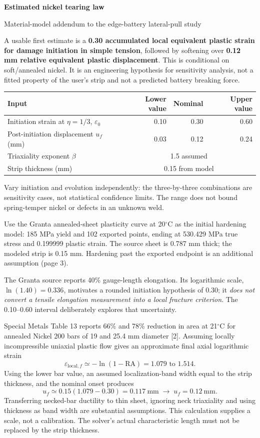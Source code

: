 \documentclass[10pt,a4paper]{article}
\newcommand{\ReportHeading}[1]{\par\vspace{6pt}{\large\bfseries\color{Teal}#1}\par\vspace{3pt}}
\newcommand{\PageTitle}[1]{{\LARGE\bfseries\color{Navy}#1\par}\vspace{7pt}}
\begin{document}
\PageTitle{Estimated nickel tearing law}
{\large\color{Teal}Material-model addendum to the edge-battery lateral-pull study}\par
A usable first estimate is a \textbf{0.30 accumulated local equivalent plastic strain for damage initiation in simple tension}, followed by softening over \textbf{0.12 mm relative equivalent plastic displacement}. This is conditional on soft/annealed nickel. It is an engineering hypothesis for sensitivity analysis, not a fitted property of the user's strip and not a predicted battery breaking force.

\ReportHeading{Proposed inputs}
\begin{center}
\begin{tabular}{p{.45\linewidth}rrr}\toprule
Input & Lower value & Nominal & Upper value\\\midrule
Initiation strain at $\eta=1/3$, $\varepsilon_0$ & 0.10 & 0.30 & 0.60\\
Post-initiation displacement $u_f$ (mm) & 0.03 & 0.12 & 0.24\\
Triaxiality exponent $\beta$ & \multicolumn{3}{c}{1.5 assumed}\\
Strip thickness (mm) & \multicolumn{3}{c}{0.15 from model}\\\bottomrule
\end{tabular}
\end{center}
Vary initiation and evolution independently: the three-by-three combinations are sensitivity cases, not statistical confidence limits. The range does not bound spring-temper nickel or defects in an unknown weld.

Use the Granta annealed-sheet plasticity curve at 20$^\circ$C as the initial hardening model: 185 MPa yield and 102 exported points, ending at 530.429 MPa true stress and 0.199999 plastic strain. The source sheet is 0.787 mm thick; the modeled strip is 0.15 mm. Hardening past the exported endpoint is an additional assumption (page 3).

\ReportHeading{How the estimate was constructed}
The Granta source reports 40\% gauge-length elongation. Its logarithmic scale, $\ln(1.40)=0.336$, motivates a rounded initiation hypothesis of 0.30; it \emph{does not convert a tensile elongation measurement into a local fracture criterion}. The 0.10--0.60 interval deliberately explores that uncertainty.

Special Metals Table 13 reports 66\% and 78\% reduction in area at 21$^\circ$C for annealed Nickel 200 bars of 19 and 25.4 mm diameter [2]. Assuming locally incompressible uniaxial plastic flow gives an approximate final axial logarithmic strain
\[
\varepsilon_{\mathrm{local},f}\simeq-\ln(1-\mathrm{RA})
       =1.079\text{ to }1.514 .
\]
Using the lower bar value, an assumed localization-band width equal to the strip thickness, and the nominal onset produces
\[
u_f \simeq 0.15(1.079-0.30)=0.117\ \mathrm{mm}
          \;\longrightarrow\; \boxed{u_f=0.12\ \mathrm{mm}}.
\]
Transferring necked-bar ductility to thin sheet, ignoring neck triaxiality and using thickness as band width are substantial assumptions. This calculation supplies a scale, not a calibration. The solver's actual characteristic length must not be replaced by the strip thickness.
\end{document}
